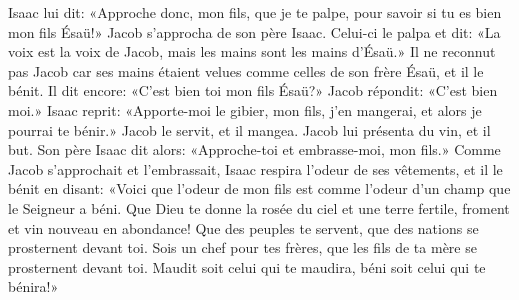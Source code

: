 Isaac lui dit: «Approche donc, mon fils, que je te palpe,
	pour savoir si tu es bien mon fils Ésaü!»
Jacob s’approcha de son père Isaac. Celui-ci le palpa et dit:
	«La voix est la voix de Jacob, mais les mains sont les mains d’Ésaü.»
Il ne reconnut pas Jacob car ses mains étaient velues comme celles de son frère Ésaü,
	et il le bénit.
Il dit encore: «C’est bien toi mon fils Ésaü?»
	Jacob répondit: «C’est bien moi.»
Isaac reprit: «Apporte-moi le gibier, mon fils,
	j’en mangerai, et alors je pourrai te bénir.»
Jacob le servit, et il mangea.
	Jacob lui présenta du vin, et il but.
Son père Isaac dit alors:
	«Approche-toi et embrasse-moi, mon fils.»
Comme Jacob s’approchait et l’embrassait,
	Isaac respira l’odeur de ses vêtements, et il le bénit en disant:
	«Voici que l’odeur de mon fils est comme l’odeur d’un champ que le Seigneur a béni.
Que Dieu te donne la rosée du ciel et une terre fertile,
	froment et vin nouveau en abondance!
	Que des peuples te servent, que des nations se prosternent devant toi.
Sois un chef pour tes frères, que les fils de ta mère se prosternent devant toi.
	Maudit soit celui qui te maudira, béni soit celui qui te bénira!»

